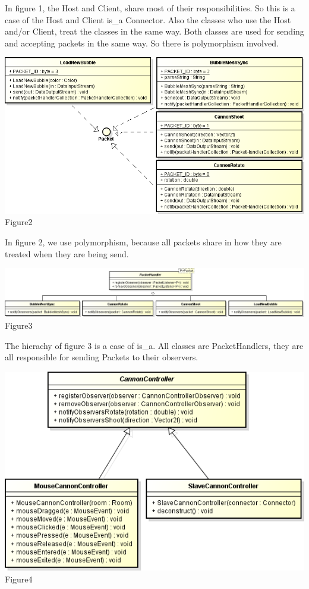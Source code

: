 \documentclass[a4paper]{article}
\begin{document}
In figure 1, the Host and Client, share most of their responsibilities. So this is a case of the Host and Client is\_a Connector. Also the classes who use the Host and/or Client, treat the classes in the same way. Both classes are used for sending and accepting packets in the same way. So there is polymorphism involved.


\includegraphics[width=1\textwidth]{PacketInher.png}
Figure2

In figure 2, we use polymorphism, because all packets share in how they are treated when they are being send.

\includegraphics[width=1\textwidth]{PacketHandlerInher.png}
Figure3

The hierachy of figure 3 is a case of is\_a. All classes are PacketHandlers, they are all responsible for sending Packets to their observers.

\includegraphics[width=1\textwidth]{CannonControllerInher.png}
Figure4
\end{document}
